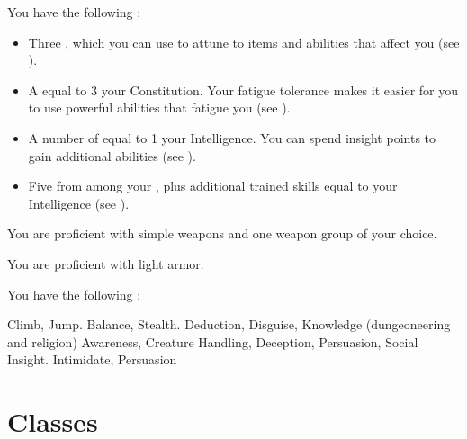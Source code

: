              You have the following :
            \begin{itemize}
                \item Three , which you can use to attune to items and abilities that affect you (see ).
                \item A  equal to 3 \add your Constitution.
                    Your fatigue tolerance makes it easier for you to use powerful abilities that fatigue you (see ).
                \item A number of  equal to 1 \add your Intelligence.
                    You can spend insight points to gain additional abilities (see ).
                \item Five  from among your , plus additional trained skills equal to your Intelligence (see ).
            \end{itemize}

            You are proficient with simple weapons and one weapon group of your choice.

            You are proficient with light armor.

            You have the following :
            \begin{itemize}
                 Climb, Jump.
                 Balance, Stealth.
                 Deduction, Disguise, Knowledge (dungeoneering and religion)
                 Awareness, Creature Handling, Deception, Persuasion, Social Insight.
                 Intimidate, Persuasion
            \end{itemize}

\section{Classes}
